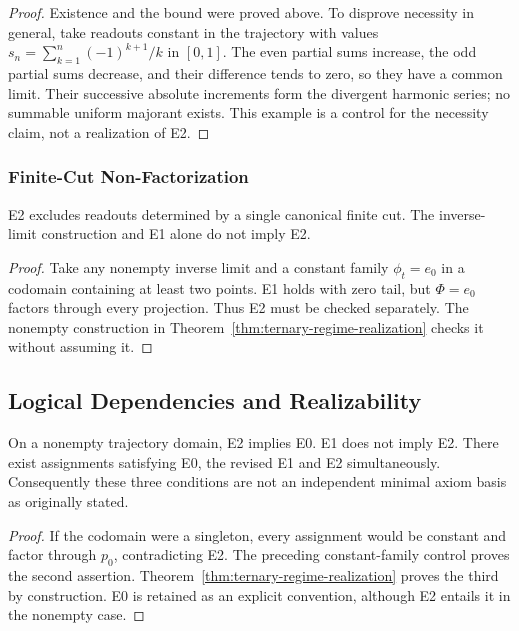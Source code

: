 \begin{proof}
Existence and the bound were proved above. To disprove necessity in general, take readouts constant in the trajectory with values $s_n=\sum_{k=1}^{n}(-1)^{k+1}/k$ in $[0,1]$. The even partial sums increase, the odd partial sums decrease, and their difference tends to zero, so they have a common limit. Their successive absolute increments form the divergent harmonic series; no summable uniform majorant exists. This example is a control for the necessity claim, not a realization of E2.
\end{proof}

\subsubsection{Finite-Cut Non-Factorization}

\begin{theorem}\label{thm:e2-necessary}
E2 excludes readouts determined by a single canonical finite cut. The inverse-limit construction and E1 alone do not imply E2.
\end{theorem}

\begin{proof}
Take any nonempty inverse limit and a constant family $\phi_t=e_0$ in a codomain containing at least two points. E1 holds with zero tail, but $\Phi=e_0$ factors through every projection. Thus E2 must be checked separately. The nonempty construction in Theorem~\ref{thm:ternary-regime-realization} checks it without assuming it.
\end{proof}

\subsection{Logical Dependencies and Realizability}

\begin{theorem}\label{thm:minimality}
On a nonempty trajectory domain, E2 implies E0. E1 does not imply E2. There exist assignments satisfying E0, the revised E1 and E2 simultaneously. Consequently these three conditions are not an independent minimal axiom basis as originally stated.
\end{theorem}

\begin{proof}
If the codomain were a singleton, every assignment would be constant and factor through $p_0$, contradicting E2. The preceding constant-family control proves the second assertion. Theorem~\ref{thm:ternary-regime-realization} proves the third by construction. E0 is retained as an explicit convention, although E2 entails it in the nonempty case.
\end{proof}

